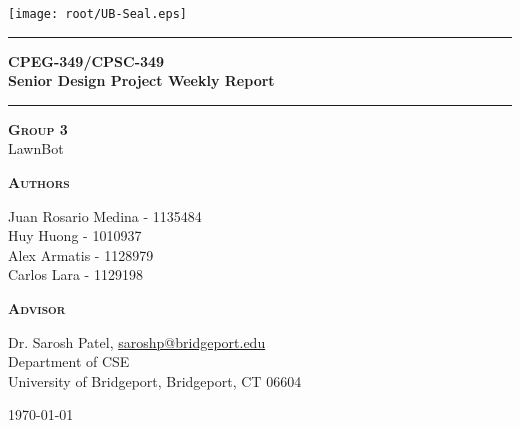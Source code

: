
\begin{titlepage}
\begin{center}
\vspace{1 cm}
\texttt{[image: root/UB-Seal.eps]}~\\[1 cm]
\vspace{1 cm}

\hrule
\vspace{.5 cm}
{ \huge \bfseries CPEG-349/CPSC-349 }
\vspace{.5 cm}
\\{\huge \bfseries Senior Design Project Weekly Report} %
\vspace{.5 cm}

\hrule
\vspace{1 cm}

\textsc{\textbf{Group 3}} \\ LawnBot \\

\vspace{.5 cm}

\textsc{\textbf{Authors}}\\ %
\centering

Juan Rosario Medina - 1135484\\
Huy Huong - 1010937\\
Alex Armatis - 1128979\\
Carlos Lara - 1129198\\

\vspace{.5 cm}

\textsc{\textbf{Advisor}}\\
\centering

Dr. Sarosh Patel, \href{mailto:saroshp@bridgeport.edu}{saroshp@bridgeport.edu} \\
Department of CSE \\
University of Bridgeport, Bridgeport, CT 06604

\vspace{1 cm}

\centering \today %
\end{center}
\end{titlepage}